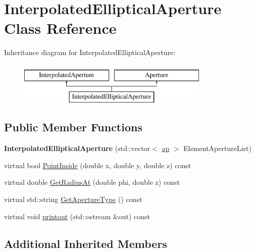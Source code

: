 \hypertarget{classInterpolatedEllipticalAperture}{}\section{Interpolated\+Elliptical\+Aperture Class Reference}
\label{classInterpolatedEllipticalAperture}
Inheritance diagram for Interpolated\+Elliptical\+Aperture\+:\begin{figure}[H]
\begin{center}
\leavevmode
\includegraphics[height=2.000000cm]{classInterpolatedEllipticalAperture}
\end{center}
\end{figure}
\subsection*{Public Member Functions}
\begin{DoxyCompactItemize}
\item 
\mbox{\label{classInterpolatedEllipticalAperture_aef39af895ecd3701141f3be35ea62ebf}} 
{\bfseries Interpolated\+Elliptical\+Aperture} (std\+::vector$<$ \hyperlink{structInterpolatedAperture_1_1ap}{ap} $>$ Element\+Aperture\+List)
\item 
virtual bool \hyperlink{classInterpolatedEllipticalAperture_a2e0b148eea71b6651cdf78df66d69e62}{Point\+Inside} (double x, double y, double z) const
\item 
virtual double \hyperlink{classInterpolatedEllipticalAperture_adcbc99d397eba723e88877d199c035d8}{Get\+Radius\+At} (double phi, double z) const
\item 
virtual std\+::string \hyperlink{classInterpolatedEllipticalAperture_a02a87b57b089796ccf55c9bbe16a11ec}{Get\+Aperture\+Type} () const
\item 
virtual void \hyperlink{classInterpolatedEllipticalAperture_aee15c62d0ff01c37120481cc821f9d87}{printout} (std\+::ostream \&out) const
\end{DoxyCompactItemize}
\subsection*{Additional Inherited Members}


